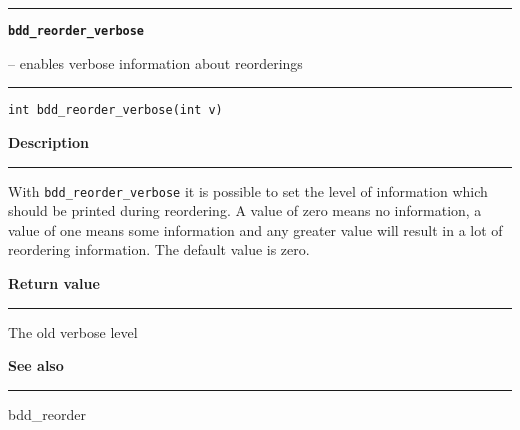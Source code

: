 \vspace{8ex}
\begin{minipage}{\textwidth}

\noindent\begin{minipage}{\textwidth}
\rule{\textwidth}{0.5mm}
{\tt\bf bdd\_reorder\_verbose }
\--- enables verbose information about reorderings  \hspace{\fill}
\\\rule[1.5ex]{\textwidth}{0.5mm}
\end{minipage}

\noindent\begin{verbatim}
int bdd_reorder_verbose(int v) 
\end{verbatim}

\vspace{\parsep}\noindent
{\bf Description}\\\rule[1.5ex]{\textwidth}{0.2mm}\vspace{-1.5ex}\setlength{\parindent}{1em}
With {\tt bdd\_reorder\_verbose} it is possible to set the level
           of information which should be printed during reordering. A value
	   of zero means no information, a value of one means some information
	   and any greater value will result in a lot of reordering
	   information. The default value is zero. 

\setlength{\parindent}{0em}\vspace{\parsep}\vspace{\baselineskip}\noindent
{\bf Return value}\\\rule[1.5ex]{\textwidth}{0.2mm}\vspace{-1.5ex}
The old verbose level 

\vspace{\parsep}\vspace{\baselineskip}\noindent
{\bf See also}\\\rule[1.5ex]{\textwidth}{0.2mm}\vspace{-1.5ex}
bdd\_reorder 
\end{minipage}
\vspace{8ex}
